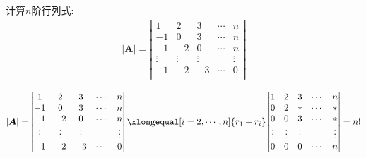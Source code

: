 \documentclass[lang=cn,newtx,10pt,scheme=chinese]{elegantbook}
\begin{document}
\begin{exercise}
计算$n$阶行列式:
\begin{gather}
|\boldsymbol{A}|=\left| \begin{matrix}
1&		2&		3&		\cdots&		n\\
-1&		0&		3&		\cdots&		n\\
-1&		-2&		0&		\cdots&		n\\
\vdots&		\vdots&		\vdots&		&		\vdots\\
-1&		-2&		-3&		\cdots&		0\\
\end{matrix} \right|
\nonumber
\end{gather}
\begin{solution}
\begin{equation}
\begin{split}
|\boldsymbol{A}|=\left| \begin{matrix}
1&		2&		3&		\cdots&		n\\
-1&		0&		3&		\cdots&		n\\
-1&		-2&		0&		\cdots&		n\\
\vdots&		\vdots&		\vdots&		&		\vdots\\
-1&		-2&		-3&		\cdots&		0\\
\end{matrix} \right|
\xlongequal[i=2,\cdots ,n]{r_1+r_i}\left| \begin{matrix}
1&		2&		3&		\cdots&		n\\
0&		2&		*&		\cdots&		*\\
0&		0&		3&		\cdots&		*\\
\vdots&		\vdots&		\vdots&		&		\vdots\\
0&		0&		0&		\cdots&		n\\
\end{matrix} \right|=n!
\end{split}
\nonumber
\end{equation}
\end{solution}
\end{exercise}
\end{document}
